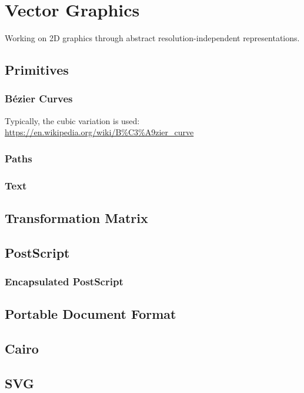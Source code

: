 \section{Vector Graphics}

Working on 2D graphics through abstract resolution-independent representations.

\subsection{Primitives}
\subsubsection{Bézier Curves}

Typically, the cubic variation is used: \url{https://en.wikipedia.org/wiki/B%C3%A9zier_curve}

\subsubsection{Paths}



\subsubsection{Text}

\subsection{Transformation Matrix}

\subsection{PostScript}
\subsubsection{Encapsulated PostScript}
\subsection{Portable Document Format}
\subsection{Cairo}
\subsection{SVG}

